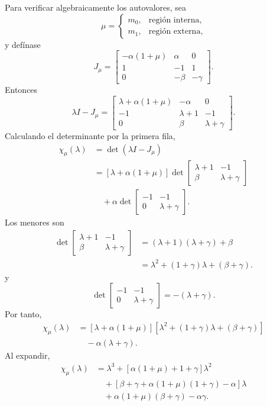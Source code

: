 \documentclass[journal]{IEEEtran}
\begin{document}
Para verificar algebraicamente los autovalores, sea
\[
\mu=
\begin{cases}
m_0, & \text{región interna},\\
m_1, & \text{región externa},
\end{cases}
\]
y defínase
\begin{equation}
J_\mu
=
\begin{bmatrix}
-\alpha(1+\mu)&\alpha&0\\
1&-1&1\\
0&-\beta&-\gamma
\end{bmatrix}.
\end{equation}
Entonces
\[
\lambda I-J_\mu
=
\begin{bmatrix}
\lambda+\alpha(1+\mu)&-\alpha&0\\
-1&\lambda+1&-1\\
0&\beta&\lambda+\gamma
\end{bmatrix}.
\]
Calculando el determinante por la primera fila,
\begin{align}
\chi_\mu(\lambda)
&=
\det(\lambda I-J_\mu)
\\
&=
\left[\lambda+\alpha(1+\mu)\right]
\det
\begin{bmatrix}
\lambda+1&-1\\
\beta&\lambda+\gamma
\end{bmatrix}
\nonumber\\
&\quad
+\alpha
\det
\begin{bmatrix}
-1&-1\\
0&\lambda+\gamma
\end{bmatrix}.
\end{align}
Los menores son
\[
\begin{aligned}
\det
\begin{bmatrix}
\lambda+1&-1\\
\beta&\lambda+\gamma
\end{bmatrix}
&=(\lambda+1)(\lambda+\gamma)+\beta\\
&=\lambda^2+(1+\gamma)\lambda+(\beta+\gamma).
\end{aligned}
\]
y
\[
\det
\begin{bmatrix}
-1&-1\\
0&\lambda+\gamma
\end{bmatrix}
=
-(\lambda+\gamma).
\]
Por tanto,
\begin{equation}
\label{eq:char_poly_mu_ns}
\begin{aligned}
\chi_\mu(\lambda)
&=
\left[\lambda+\alpha(1+\mu)\right]
\left[
\lambda^2+(1+\gamma)\lambda+(\beta+\gamma)
\right]\\
&\quad-\alpha(\lambda+\gamma).
\end{aligned}
\end{equation}
Al expandir,
\begin{align}
\chi_\mu(\lambda)
&=
\lambda^3
+
\left[
\alpha(1+\mu)+1+\gamma
\right]\lambda^2
\nonumber\\
&\quad+
\left[
\beta+\gamma
+
\alpha(1+\mu)(1+\gamma)
-\alpha
\right]\lambda
\nonumber\\
&\quad+
\alpha(1+\mu)(\beta+\gamma)
-\alpha\gamma.
\end{align}
\end{document}
